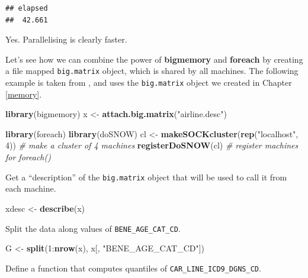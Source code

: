 \documentclass[]{book}
\newenvironment{Shaded}{\begin{snugshade}}{\end{snugshade}}
\newcommand{\KeywordTok}[1]{\textcolor[rgb]{0.13,0.29,0.53}{\textbf{{#1}}}}
\newcommand{\DecValTok}[1]{\textcolor[rgb]{0.00,0.00,0.81}{{#1}}}
\newcommand{\StringTok}[1]{\textcolor[rgb]{0.31,0.60,0.02}{{#1}}}
\newcommand{\CommentTok}[1]{\textcolor[rgb]{0.56,0.35,0.01}{\textit{{#1}}}}
\newcommand{\NormalTok}[1]{{#1}}
\theoremstyle{definition}
\theoremstyle{definition}
\theoremstyle{remark}
\begin{document}
\begin{verbatim}
## elapsed 
##  42.661
\end{verbatim}

Yes. Parallelising is clearly faster.

Let's see how we can combine the power of \textbf{bigmemory} and
\textbf{foreach} by creating a file mapped \texttt{big.matrix} object,
which is shared by all machines. The following example is taken from
\citet{kane2013scalable}, and uses the \texttt{big.matrix} object we
created in Chapter \ref{memory}.

\begin{Shaded}
\begin{Highlighting}[]
\KeywordTok{library}\NormalTok{(bigmemory)}
\NormalTok{x <-}\StringTok{ }\KeywordTok{attach.big.matrix}\NormalTok{(}\StringTok{"airline.desc"}\NormalTok{)}

\KeywordTok{library}\NormalTok{(foreach)}
\KeywordTok{library}\NormalTok{(doSNOW)}
\NormalTok{cl <-}\StringTok{ }\KeywordTok{makeSOCKcluster}\NormalTok{(}\KeywordTok{rep}\NormalTok{(}\StringTok{"localhost"}\NormalTok{, }\DecValTok{4}\NormalTok{)) }\CommentTok{# make a cluster of 4 machines}
\KeywordTok{registerDoSNOW}\NormalTok{(cl) }\CommentTok{# register machines for foreach()}
\end{Highlighting}
\end{Shaded}

Get a ``description'' of the \texttt{big.matrix} object that will be
used to call it from each machine.

\begin{Shaded}
\begin{Highlighting}[]
\NormalTok{xdesc <-}\StringTok{ }\KeywordTok{describe}\NormalTok{(x) }
\end{Highlighting}
\end{Shaded}

Split the data along values of \texttt{BENE\_AGE\_CAT\_CD}.

\begin{Shaded}
\begin{Highlighting}[]
\NormalTok{G <-}\StringTok{ }\KeywordTok{split}\NormalTok{(}\DecValTok{1}\NormalTok{:}\KeywordTok{nrow}\NormalTok{(x), x[, }\StringTok{"BENE_AGE_CAT_CD"}\NormalTok{]) }
\end{Highlighting}
\end{Shaded}

Define a function that computes quantiles of
\texttt{CAR\_LINE\_ICD9\_DGNS\_CD}.
\end{document}
